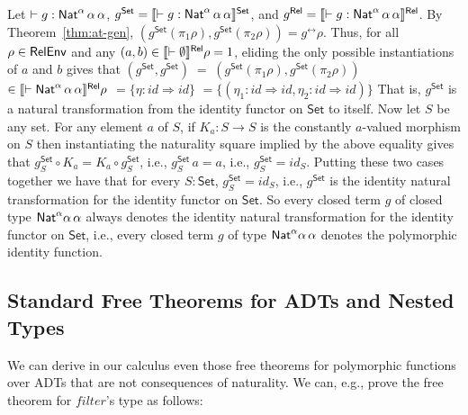 \documentclass{lmcs}
\theoremstyle{plain}\newtheorem{satz}[thm]{Satz}
\newcommand{\set}{\mathsf{Set}}
\renewcommand{\id}{\mathit{id}}
\begin{document}
{Let $ \vdash g : \mathsf{Nat}^\alpha \,\alpha\,\alpha$, \/$g^\set =
\setsem{\vdash g : \Nat^\alpha \,\alpha\,\alpha}$, and $g^{\mathsf{Rel}} =
\llbracket{\vdash g : \mathsf{Nat}^\alpha \,\alpha\,\alpha}\rrbracket^{\mathsf{Rel}}$.  By
Theorem~\ref{thm:at-gen}, $(g^\set(\pi_1\rho),g^\set(\pi_2\rho)) =
g^\rel\rho$. Thus, for all $\rho \in \mathsf{RelEnv}$ and any $(a, b) \in
\llbracket{\vdash \emptyset}\rrbracket^{\mathsf{Rel}}\rho = 1$, eliding the only possible
instantiations of $a$ and $b$ gives that $(g^\set, g^\set) \; = \;
(g^\set(\pi_1 \rho), g^\set (\pi_2 \rho))$ $ \in \llbracket{\vdash
  \mathsf{Nat}^\alpha \,\alpha\,\alpha}\rrbracket^{\mathsf{Rel}}\rho$ $ = \{\eta : \id \Rightarrow
\id\}$ $ = \{(\eta_1 : \id \Rightarrow \id, \eta_2 : \id \Rightarrow
\id)\}$ That is, $g^\set$ is a natural transformation from the
identity functor on $\set$ to itself. Now let $S$ be any set.  For any
element $a$ of $S$, if $K_a :S \to S$ is the constantly $a$-valued
morphism on $S$ then instantiating the naturality square implied by
the above equality gives that $g^\set_S \circ K_a = K_a \circ
g^\set_S$, i.e., $g^\set_S \, a = a$, i.e., $g^\set_S = \id_S$.
Putting these two cases together we have that for every $S : \set$,
$g^\set_S = \id_S$, i.e., $g^\set$ is the identity natural
transformation for the identity functor on $\set$. So every closed
term $g$ of closed type $\mathsf{Nat}^\alpha\alpha\,\alpha$ always denotes the
identity natural transformation for the identity functor on $\set$,
i.e., every closed term $g$ of type $\mathsf{Nat}^\alpha\alpha\,\alpha$
denotes the polymorphic identity function.

\subsection{Standard Free Theorems for ADTs and Nested
  Types}\label{sec:ft-adt} 

We can derive in our calculus even those free theorems for polymorphic
functions over ADTs that are not consequences of naturality.  We can,
e.g., prove the free theorem for $\mathit{filter}$'s type as follows:

}
\end{document}
